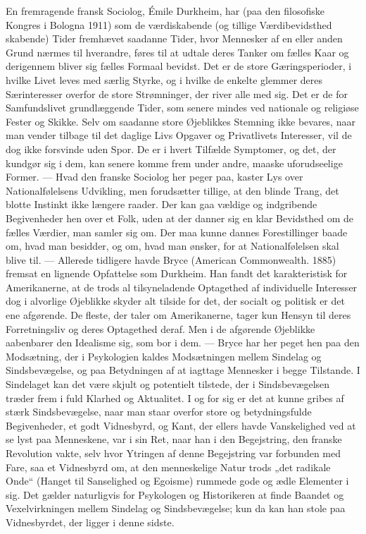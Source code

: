 \documentclass[12pt,a4paper,openany]{book}
\newcommand{\opage}[1]{\marginnote{\footnotesize\textit{[#1]}}}
\begin{document}
En fremragende fransk Sociolog, Émile Durkheim, har (paa den
filosofiske Kongres i Bologna 1911) som de værdiskabende (og tillige
Værdibevidsthed skabende) Tider fremhævet saadanne Tider, hvor
Mennesker af en eller anden Grund nærmes til hverandre, føres til
at udtale deres Tanker om fælles Kaar og derigennem bliver sig
fælles Formaal bevidst. Det er de store Gæringsperioder, i hvilke Livet
leves med særlig Styrke, og i hvilke de enkelte glemmer deres
Særinteresser overfor de store Strømninger, der river alle med sig.
Det er de for Samfundslivet grundlæggende Tider, som senere mindes
ved nationale og religiøse Fester og Skikke. Selv om saadanne
store Øjeblikkes Stemning ikke bevares, naar man vender tilbage til
det daglige Livs Opgaver og Privatlivets Interesser, vil de dog ikke
forsvinde uden Spor. De er i hvert Tilfælde Symptomer, og det, der
kundgør sig i dem, kan senere komme frem under andre, maaske
uforudseelige Former. --- Hvad den franske Sociolog her peger paa,
kaster Lys over Nationalfølelsens Udvikling, men forudsætter tillige,
at den blinde Trang, det blotte Instinkt ikke længere raader. Der
kan gaa vældige og indgribende Begivenheder hen over et Folk, uden
at der danner sig en klar Bevidsthed om de fælles Værdier, man
samler sig om. Der maa kunne dannes Forestillinger baade om, hvad
man besidder, og om, hvad man ønsker, for at Nationalfølelsen skal
blive til. --- Allerede tidligere havde Bryce (American Commonwealth.
1885) fremsat en lignende Opfattelse som Durkheim. Han
fandt det karakteristisk for Amerikanerne, at de trods al tilsyneladende
Optagethed af individuelle Interesser dog i alvorlige Øjeblikke
skyder alt tilside for det, der socialt og politisk er det ene afgørende.
De fleste, der taler om Amerikanerne, tager kun Hensyn til
deres Forretningsliv og deres Optagethed deraf. Men i de afgørende
Øjeblikke aabenbarer den Idealisme sig, som bor i dem. --- Bryce
har her peget hen paa den Modsætning, der i Psykologien kaldes
Modsætningen mellem Sindelag og Sindsbevægelse, og paa Betydningen
af at iagttage Mennesker i begge Tilstande. I Sindelaget kan
det være skjult og potentielt tilstede, der i Sindsbevægelsen træder
\opage{110}frem i fuld Klarhed og Aktualitet. I og for sig er det at kunne gribes
af stærk Sindsbevægelse, naar man staar overfor store og betydningsfulde
Begivenheder, et godt Vidnesbyrd, og Kant, der ellers
havde Vanskelighed ved at se lyst paa Menneskene, var i sin Ret,
naar han i den Begejstring, den franske Revolution vakte, selv hvor
Ytringen af denne Begejstring var forbunden med Fare, saa et
Vidnesbyrd om, at den menneskelige Natur trods „det radikale
Onde“ (Hanget til Sanselighed og Egoisme) rummede gode og ædle
Elementer i sig. Det gælder naturligvis for Psykologen og Historikeren
at finde Baandet og Vexelvirkningen mellem Sindelag og Sindsbevægelse;
kun da kan han stole paa Vidnesbyrdet, der ligger i denne
sidste.
\end{document}
